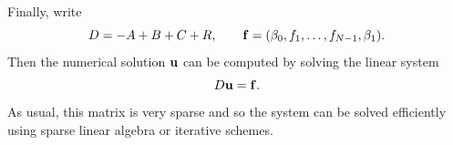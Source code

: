 Finally, write 
\begin{equation*}
    D = -A + B + C + R , \qquad \mathbf{f} = (\beta_0, f_1, \dots, f_{N-1}, \beta_1). 
\end{equation*}
Then the numerical solution $\mathbf{u}$ can be computed by solving the 
linear system 
\begin{equation*}
    D \mathbf{u} = \mathbf{f}.
\end{equation*}
As usual, this matrix is very sparse and so the system can be 
solved efficiently using sparse linear algebra or iterative schemes. 



% 
% 